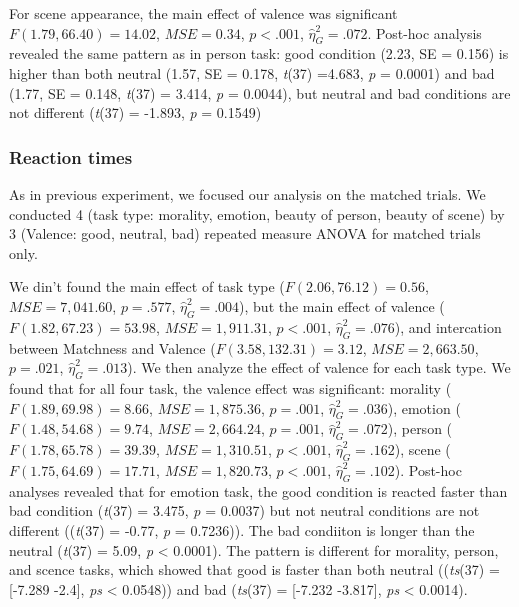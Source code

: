 \documentclass[
  english,
  man]{apa6}
\begin{document}
For scene appearance, the main effect of valence was significant \(F(1.79, 66.40) = 14.02\), \(\mathit{MSE} = 0.34\), \(p < .001\), \(\hat{\eta}^2_G = .072\). Post-hoc analysis revealed the same pattern as in person task: good condition (2.23, SE = 0.156) is higher than both neutral (1.57, SE = 0.178, \emph{t}(37) =4.683, \emph{p} = 0.0001) and bad (1.77, SE = 0.148, \emph{t}(37) = 3.414, \emph{p} = 0.0044), but neutral and bad conditions are not different (\emph{t}(37) = -1.893, \emph{p} = 0.1549)

\hypertarget{reaction-times-2}{%
\subsubsection{Reaction times}\label{reaction-times-2}}

As in previous experiment, we focused our analysis on the matched trials. We conducted 4 (task type: morality, emotion, beauty of person, beauty of scene) by 3 (Valence: good, neutral, bad) repeated measure ANOVA for matched trials only.

We din't found the main effect of task type (\(F(2.06, 76.12) = 0.56\), \(\mathit{MSE} = 7,041.60\), \(p = .577\), \(\hat{\eta}^2_G = .004\)), but the main effect of valence (\(F(1.82, 67.23) = 53.98\), \(\mathit{MSE} = 1,911.31\), \(p < .001\), \(\hat{\eta}^2_G = .076\)), and intercation between Matchness and Valence (\(F(3.58, 132.31) = 3.12\), \(\mathit{MSE} = 2,663.50\), \(p = .021\), \(\hat{\eta}^2_G = .013\)). We then analyze the effect of valence for each task type. We found that for all four task, the valence effect was significant: morality (\(F(1.89, 69.98) = 8.66\), \(\mathit{MSE} = 1,875.36\), \(p = .001\), \(\hat{\eta}^2_G = .036\)), emotion (\(F(1.48, 54.68) = 9.74\), \(\mathit{MSE} = 2,664.24\), \(p = .001\), \(\hat{\eta}^2_G = .072\)), person (\(F(1.78, 65.78) = 39.39\), \(\mathit{MSE} = 1,310.51\), \(p < .001\), \(\hat{\eta}^2_G = .162\)), scene (\(F(1.75, 64.69) = 17.71\), \(\mathit{MSE} = 1,820.73\), \(p < .001\), \(\hat{\eta}^2_G = .102\)). Post-hoc analyses revealed that for emotion task, the good condition is reacted faster than bad condition (\emph{t}(37) = 3.475, \emph{p} = 0.0037) but not neutral conditions are not different ((\emph{t}(37) = -0.77, \emph{p} = 0.7236)). The bad condiiton is longer than the neutral (\emph{t}(37) = 5.09, \emph{p} \textless{} 0.0001). The pattern is different for morality, person, and scence tasks, which showed that good is faster than both neutral ((\emph{ts}(37) = {[}-7.289 -2.4{]}, \emph{ps} \textless{} 0.0548)) and bad (\emph{ts}(37) = {[}-7.232 -3.817{]}, \emph{ps} \textless{} 0.0014).
\end{document}
